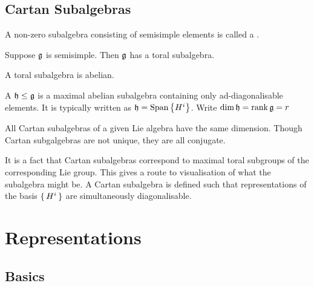 \documentclass{article}
\begin{document}
\subsection{Cartan Subalgebras}

\begin{definition}
	A non-zero subalgebra consisting of semisimple elements is called a .
\end{definition}

\begin{definition}
	Suppose $\mathfrak{g}$ is semisimple. Then $\mathfrak{g}$ has a toral subalgebra. 
\end{definition}
\begin{lemma}
	A toral subalgebra is abelian.
\end{lemma}


\begin{definition}
	A  $\mathfrak{h}\leq\mathfrak{g}$ is a maximal abelian subalgebra containing only ad-diagonalisable elements. It is typically written as $\mathfrak{h}=\operatorname{Span}\left\{ H^i \right\}$. Write $\dim{\mathfrak{h}}=\operatorname{rank}{\mathfrak{g}}=r$
\end{definition}



\begin{fact}
	All Cartan subalgebras of a given Lie algebra have the same dimension. Though Cartan subgalgebras are not unique, they are all conjugate. 
\end{fact}

\begin{idea}
	It is a fact that Cartan subalgebras correspond to maximal toral subgroups of the corresponding Lie group. This gives a route to visualisation of what the subalgebra might be. A Cartan subalgebra is defined such that representations of the basis $\set{ H^i }$ are simultaneously diagonalisable. 
\end{idea}




\section{Representations}

\subsection{Basics}
\end{document}

